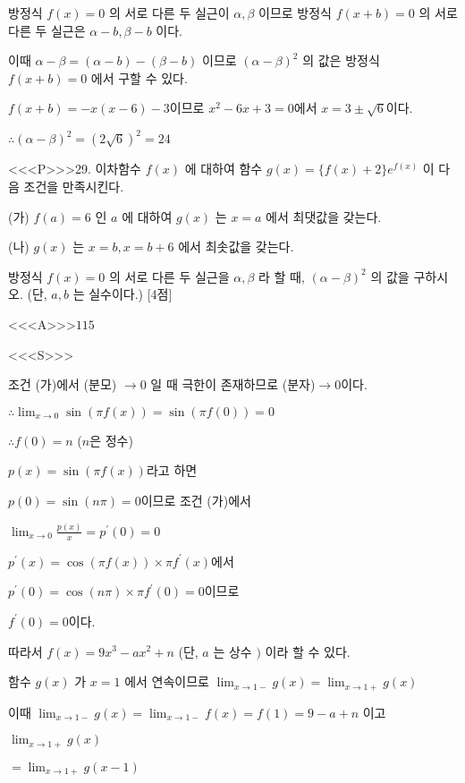 \documentclass{oblivoir}
\begin{document}
방정식 $f(x)=0$ 의 서로 다른 두 실근이 $\alpha, \beta$ 이므로 방정식 $f(x+b)=0$ 의 서로 다른 두 실근은 $\alpha-b, \beta-b$ 이다.

이때 $\alpha-\beta=(\alpha-b)-(\beta-b)$ 이므로 $(\alpha-\beta)^{2}$ 의 값은 방정식 $f(x+b)=0$ 에서 구할 수 있다.

$f(x+b)=-x(x-6)-3$이므로 $x^{2}-6 x+3=0$에서 $x=3 \pm \sqrt{6}$이다.

$\therefore(\alpha-\beta)^{2}=(2 \sqrt{6})^{2}=24$



<<<P>>>29. 이차함수 $f(x)$ 에 대하여 함수 $g(x)=\{f(x)+2\} e^{f(x)}$ 이 다음 조건을 만족시킨다.

(가) $f(a)=6$ 인 $a$ 에 대하여 $g(x)$ 는 $x=a$ 에서 최댓값을 갖는다.

(나) $g(x)$ 는 $x=b, x=b+6$ 에서 최솟값을 갖는다.

방정식 $f(x)=0$ 의 서로 다른 두 실근을 $\alpha, \beta$ 라 할 때, $(\alpha-\beta)^{2}$ 의 값을 구하시오. (단, $a, b$ 는 실수이다.) [4점]



<<<A>>>$115$

<<<S>>>



조건 (가)에서 (분모) $\rightarrow 0$ 일 때 극한이 존재하므로 (분자)$\rightarrow 0$이다.

$\therefore \lim _{x \rightarrow 0} \sin (\pi f(x))=\sin (\pi f(0))=0 $

$\therefore f(0)=n$ ($n$은 정수)

$p(x)=\sin (\pi f(x))$라고 하면

$p(0)=\sin (n \pi)=0$이므로 조건 (가)에서

$\lim _{x \rightarrow 0} \frac{p(x)}{x}=p^{\prime}(0)=0$

$p^{\prime}(x)=\cos (\pi f(x)) \times \pi f^{\prime}(x)$에서

$p^{\prime}(0)=\cos (n \pi) \times \pi f^{\prime}(0)=0$이므로

$f^{\prime}(0)=0$이다.

따라서 $f(x)=9 x^{3}-a x^{2}+n$ (단, $a$ 는 상수 $)$ 이라 할 수 있다.

함수 $g(x)$ 가 $x=1$ 에서 연속이므로 $\lim _{x \rightarrow 1-} g(x)=\lim _{x \rightarrow 1+} g(x)$

이때 $\lim _{x \rightarrow 1-} g(x)=\lim _{x \rightarrow 1-} f(x)=f(1)=9-a+n$ 이고

$\lim _{x \rightarrow 1+} g(x) $

$=\lim _{x \rightarrow 1+} g(x-1)$
\end{document}
